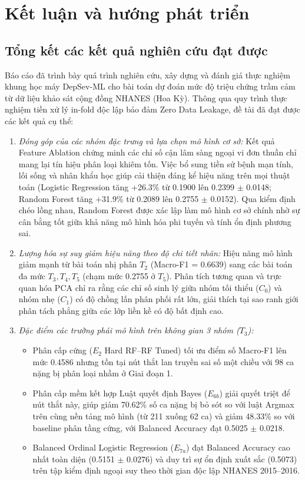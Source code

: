 \chapter{Kết luận và hướng phát triển}
\label{ch:ket-luan}

\section{Tổng kết các kết quả nghiên cứu đạt được}
\label{sec:ket-luan-khoa-hoc}

Báo cáo đã trình bày quá trình nghiên cứu, xây dựng và đánh giá thực nghiệm khung học máy DepSev-ML cho bài toán dự đoán mức độ triệu chứng trầm cảm từ dữ liệu khảo sát cộng đồng NHANES (Hoa Kỳ). Thông qua quy trình thực nghiệm tiền xử lý in-fold độc lập bảo đảm Zero Data Leakage, đề tài đã đạt được các kết quả cụ thể:

\begin{enumerate}
    \item \textit{Đóng góp của các nhóm đặc trưng và lựa chọn mô hình cơ sở:} Kết quả Feature Ablation chứng minh các chỉ số cận lâm sàng ngoại vi đơn thuần chỉ mang lại tín hiệu phân loại khiêm tốn. Việc bổ sung tiền sử bệnh mạn tính, lối sống và nhân khẩu học giúp cải thiện đáng kể hiệu năng trên mọi thuật toán (Logistic Regression tăng +26.3\% từ 0.1900 lên 0.2399 $\pm$ 0.0148; Random Forest tăng +31.9\% từ 0.2089 lên 0.2755 $\pm$ 0.0152). Qua kiểm định chéo lồng nhau, Random Forest được xác lập làm mô hình cơ sở chính nhờ sự cân bằng tốt giữa khả năng mô hình hóa phi tuyến và tính ổn định phương sai.
    \item \textit{Lượng hóa sự suy giảm hiệu năng theo độ chi tiết nhãn:} Hiệu năng mô hình giảm mạnh từ bài toán nhị phân $T_2$ (Macro-F1 = 0.6639) sang các bài toán đa mức $T_3, T_4, T_5$ (chạm mức 0.2755 ở $T_5$). Phân tích tương quan và trực quan hóa PCA chỉ ra rằng các chỉ số sinh lý giữa nhóm tối thiểu ($C_0$) và nhóm nhẹ ($C_1$) có độ chồng lấn phân phối rất lớn, giải thích tại sao ranh giới phân tách phẳng giữa các lớp liền kề có độ bất định cao.
    \item \textit{Đặc điểm các trường phái mô hình trên không gian 3 nhóm ($T_3$):} 
    \begin{itemize}
        \item Phân cấp cứng ($E_2$ Hard RF--RF Tuned) tối ưu điểm số Macro-F1 lên mức 0.4586 nhưng tồn tại nút thắt lan truyền sai số một chiều với 98 ca nặng bị phân loại nhầm ở Giai đoạn 1.
        \item Phân cấp mềm kết hợp Luật quyết định Bayes ($E_{6b}$) giải quyết triệt để nút thắt này, giúp giảm 70.62\% số ca nặng bị bỏ sót so với luật Argmax trên cùng nền tảng mô hình (từ 211 xuống 62 ca) và giảm 48.33\% so với baseline phân tầng cứng, với Balanced Accuracy đạt 0.5025 $\pm$ 0.0218.
        \item Balanced Ordinal Logistic Regression ($E_{7a}$) đạt Balanced Accuracy cao nhất toàn diện (0.5151 $\pm$ 0.0276) và duy trì sự ổn định xuất sắc (0.5073) trên tập kiểm định ngoại suy theo thời gian độc lập NHANES 2015--2016.
    \end{itemize}
\end{enumerate}

